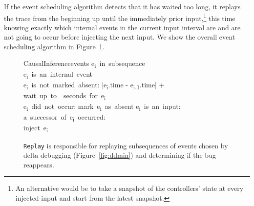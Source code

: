 If the event scheduling algorithm detects that it has waited too long, it
replays the trace from the beginning up until the immediately prior input,\footnote{An alternative
would be to take a snapshot of the controllers' state at every injected input
and start from the latest snapshot.} this time
knowing exactly which internal events in the current input interval are
and are not going to occur before injecting the next input. We show the overall event scheduling algorithm
in Figure~\ref{fig:peek}.

\begin{figure}
  \begin{pseudocode}[framebox]{CausalInference}{events}
    \FOR e\textsubscript{i}\ in\ subsequence \\
    \BEGIN
    \IF e\textsubscript{i}\ is\ an\ internal\ event \\
    \AND e\textsubscript{i}\ is\ not\ marked\ absent:
    \THEN
    \BEGIN
      \Delta \GETS |e\textsubscript{i}.time - e\textsubscript{i-1}.time| + \epsilon \\
      wait\ up\ to\ \Delta\ seconds\ for\ e\textsubscript{i} \\
      \IF e\textsubscript{i}\ did\ not\ occur:
      \THEN mark\ e\textsubscript{i}\ as\ absent
    \END
    \ELSEIF e\textsubscript{i}\ is\ an\ input:
    \THEN
    \BEGIN
      \IF a\ successor\ of\ e\textsubscript{i}\ occurred: \\
      \THEN
      \ELSE
        inject\ e\textsubscript{i}
      \END
    \END
    \ENDPROCEDURE
     \\
  \end{pseudocode}
  \label{fig:peek}
  \caption{{\tt Replay} is responsible for replaying subsequences of events
  chosen by delta debugging (Figure~\ref{fig:ddmin}) and determining
  if the bug reappears. }
\end{figure}

%

